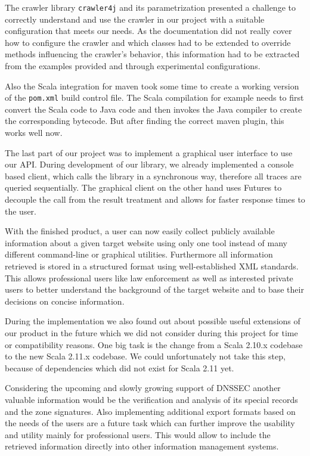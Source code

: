 \documentclass[
	a4paper,					10pt,							twoside,					openright,				notitlepage,			parskip=half,			]{scrreprt}
\begin{document}
The crawler library \verb|crawler4j| and its parametrization presented a challenge to correctly understand and use the crawler in our 
project with a suitable configuration that meets our needs. As the documentation did not really cover how to configure the
crawler and which classes had to be extended to override methods influencing the crawler's behavior, this information had to be extracted
from the examples provided and through experimental configurations.

Also the Scala integration for maven took some time to create a working version of the \verb|pom.xml| build control file.
 The Scala compilation for example needs to first convert the Scala code to Java code and then invokes the Java compiler 
 to create the corresponding bytecode. But after finding the correct maven plugin, this works well now.

\newpage
The last part of our project was to implement a graphical user interface to use our \gls{API}. During development of our library, we already
implemented a console based client, which calls the library in a synchronous way, therefore all traces are queried sequentially. The
graphical client on the other hand uses Futures to decouple the call from the result treatment and allows for faster response times 
to the user.

With the finished product, a user can now easily collect publicly available information about a given target website using only one tool
instead of many different command-line or graphical utilities. Furthermore all information retrieved is stored in a structured format 
using well-established \gls{XML} standards. This allows professional users like law enforcement as well as interested private users to better
understand the background of the target website and to base their decisions on concise information.

During the implementation we also found out about possible useful extensions of our product in the future which we did not consider during 
this project for time or compatibility reasons. One big task is the change from a Scala 2.10.x codebase to the new Scala 2.11.x codebase.
We could unfortunately not take this step, because of dependencies which did not exist for Scala 2.11 yet. 

Considering the upcoming and slowly growing support of \gls{DNSSEC} another valuable information would be the verification and analysis of its
special records and the zone signatures. Also implementing additional export formats based on the needs of the users are a future task
which can further improve the usability and utility mainly for professional users. This would allow to include the retrieved information
directly into other information management systems.
\end{document}
